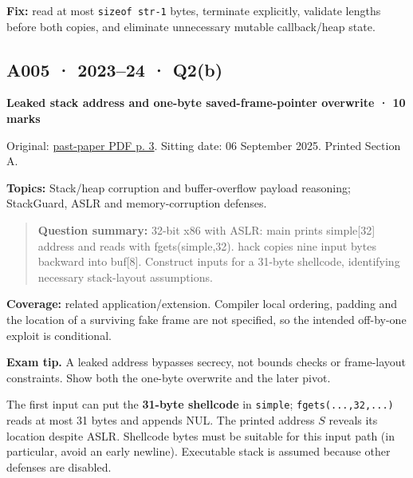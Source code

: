 \documentclass[11pt,a4paper]{article}
\begin{document}
\textbf{Fix:} read at most \texttt{sizeof str-1} bytes,\allowbreak{} terminate explicitly,\allowbreak{} validate lengths before both copies,\allowbreak{} and eliminate unnecessary mutable callback/\allowbreak{}heap state.




\clearpage
\subsection{A005 · 2023–24 · Q2(b)}\label{a005}

\textbf{Leaked stack address and one-byte saved-frame-pointer overwrite · 10 marks}


Original: \href{../../CSE405-Security_Merged.pdf\#page=3}{past-paper PDF p. 3}. Sitting date: 06 September 2025. Printed Section A.


\textbf{Topics:} Stack/\allowbreak{}heap corruption and buffer-overflow payload reasoning; StackGuard,\allowbreak{} ASLR and memory-corruption defenses.



\begin{quote}\small

\textbf{Question summary:} 32-bit x86 with ASLR: main prints simple[32] address and reads with fgets(simple,\allowbreak{}32). hack copies nine input bytes backward into buf[8]. Construct inputs for a 31-byte shellcode,\allowbreak{} identifying necessary stack-layout assumptions.



\end{quote}

\textbf{Coverage:} related application/\allowbreak{}extension. Compiler local ordering,\allowbreak{} padding and the location of a surviving fake frame are not specified,\allowbreak{} so the intended off-by-one exploit is conditional.



{\color{ForestGreen}\textbf{Exam tip.} A leaked address bypasses secrecy,\allowbreak{} not bounds checks or frame-layout constraints. Show both the one-byte overwrite and the later pivot.}


The first input can put the \textbf{31-byte shellcode} in \texttt{simple}; \texttt{fgets(...,\allowbreak{}32,\allowbreak{}...)} reads at most 31 bytes and appends NUL. The printed address \(S\) reveals its location despite ASLR. Shellcode bytes must be suitable for this input path (in particular,\allowbreak{} avoid an early newline). Executable stack is assumed because other defenses are disabled.
\end{document}
